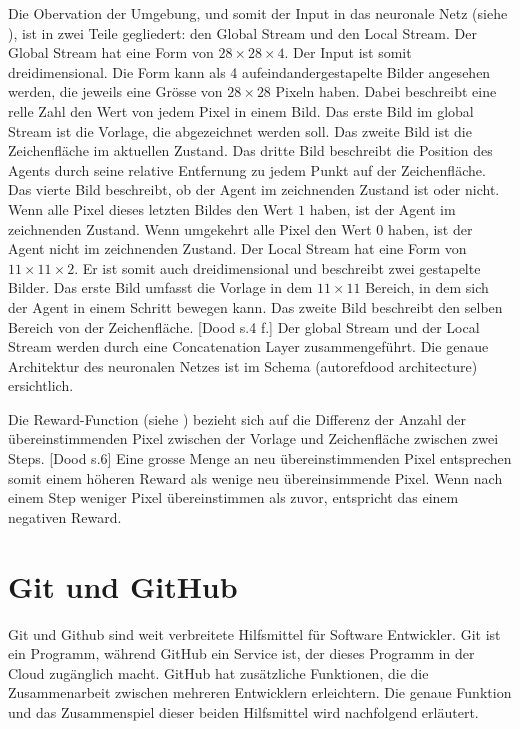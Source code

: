 Die Obervation der Umgebung, und somit der Input in das neuronale Netz (siehe
), ist in zwei Teile gegliedert: den Global Stream und
den Local Stream. Der Global Stream hat eine Form von $28\times28\times4$. Der
Input ist somit dreidimensional. Die Form kann als 4 aufeindandergestapelte
Bilder angesehen werden, die jeweils eine Grösse von $28\times28$ Pixeln haben.
Dabei beschreibt eine relle Zahl den Wert von jedem Pixel in einem Bild. Das
erste Bild im global Stream ist die Vorlage, die abgezeichnet werden soll. Das
zweite Bild ist die Zeichenfläche im aktuellen Zustand. Das dritte Bild
beschreibt die Position des Agents durch seine relative Entfernung zu jedem
Punkt auf der Zeichenfläche. Das vierte Bild beschreibt, ob der Agent im
zeichnenden Zustand ist oder nicht. Wenn alle Pixel dieses letzten Bildes den
Wert $1$ haben, ist der Agent im zeichnenden Zustand. Wenn umgekehrt alle Pixel
den Wert $0$ haben, ist der Agent nicht im zeichnenden Zustand. 
Der Local Stream hat eine Form von $11\times11\times2$. Er ist somit auch
dreidimensional und beschreibt zwei gestapelte Bilder. Das erste Bild umfasst
die Vorlage in dem $11\times11$ Bereich, in dem sich der Agent in einem Schritt
bewegen kann. Das zweite Bild beschreibt den selben Bereich von der
Zeichenfläche. [Dood s.4 f.] Der global Stream und der Local Stream werden durch
eine Concatenation Layer zusammengeführt. Die genaue Architektur des neuronalen
Netzes ist im Schema (autoref{dood architecture}) ersichtlich.  


Die Reward-Function (siehe ) bezieht sich auf die
Differenz der Anzahl der übereinstimmenden Pixel zwischen der Vorlage und
Zeichenfläche zwischen zwei Steps. [Dood s.6] Eine grosse Menge an neu
übereinstimmenden Pixel entsprechen somit einem höheren Reward als wenige neu
übereinsimmende Pixel. Wenn nach einem Step weniger Pixel übereinstimmen als
zuvor, entspricht das einem negativen Reward. 

\section{Git und GitHub}
\label{chap:t_git}
Git und Github sind weit verbreitete Hilfsmittel für Software Entwickler. Git
ist ein Programm, während GitHub ein Service ist, der dieses Programm in der
Cloud zugänglich macht. GitHub hat zusätzliche Funktionen, die die Zusammenarbeit
zwischen mehreren Entwicklern erleichtern. Die genaue Funktion und das
Zusammenspiel dieser beiden Hilfsmittel wird nachfolgend erläutert.

